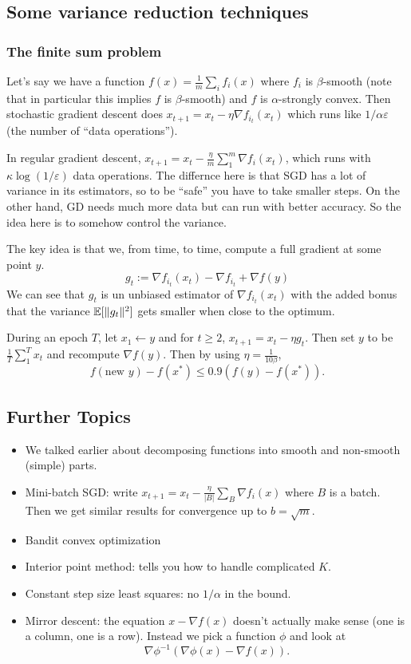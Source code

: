 \documentclass[12pt]{article}
\newcommand{\grad}{\nabla}
\begin{document}
\subsection{Some variance reduction techniques}
\subsubsection{The finite sum problem}
Let's say we have a function $f(x)=\frac{1}{m}\sum_i f_i(x)$ where $f_i$ is $\beta$-smooth (note that in particular this implies $f$ is $\beta$-smooth) and $f$ is $\alpha$-strongly convex.
Then stochastic gradient descent does $x_{t+1}=x_t-\eta\grad f_{i_t}(x_t)$ which runs like $1/\alpha\varepsilon$ (the number of ``data operations'').

In regular gradient descent, $x_{t+1}=x_t-\frac{\eta}{m}\sum_1^m\grad f_i(x_t)$, which runs with $\kappa\log(1/\varepsilon)$ data operations.
The differnce here is that SGD has a lot of variance in its estimators, so to be ``safe'' you have to take smaller steps. On the other hand, GD needs much more data but can run with better accuracy.
So the idea here is to somehow control the variance.

The key idea is that we, from time, to time, compute a full gradient at some point $y$.
\[g_t:=\grad f_{i_t}(x_t)-\grad f_{i_t}+\grad f(y)\]
We can see that $g_t$ is un unbiased estimator of $\grad f_{i_t}(x_t)$ with the added bonus that the variance $\mathbb{E}[\|g_t\|^2]$ gets smaller when close to the optimum.
\begin{thm}
	During an epoch $T$, let $x_1\leftarrow y$ and for $t\ge 2$, $x_{t+1}=x_t-\eta g_t$. Then set $y$ to be $\frac{1}{T}\sum_1^Tx_t$ and recompute $\grad f(y)$.
	Then by using $\eta=\frac{1}{10\beta}$,
	\[f(\text{new } y)-f(x^\ast)\le 0.9 (f(y)-f(x^\ast)).\]
\end{thm}

\subsection{Further Topics}
\begin{itemize}
	\item We talked earlier about decomposing functions into smooth and non-smooth (simple) parts. 
	\item Mini-batch SGD: write $x_{t+1}=x_t-\frac{\eta}{|B|}\sum_B\grad f_i(x)$ where $B$ is a batch. Then we get similar results for convergence up to $b=\sqrt{m}$.
	\item Bandit convex optimization
	\item Interior point method: tells you how to handle complicated $K.$
	\item Constant step size least squares: no $1/\alpha$ in the bound.
	\item Mirror descent: the equation $x-\grad f(x)$ doesn't actually make sense (one is a column, one is a row). Instead we pick a function $\phi$ and look at 
	\[\grad\phi^{-1}(\grad\phi(x)-\grad f(x)).\]
\end{itemize}
\end{document}
